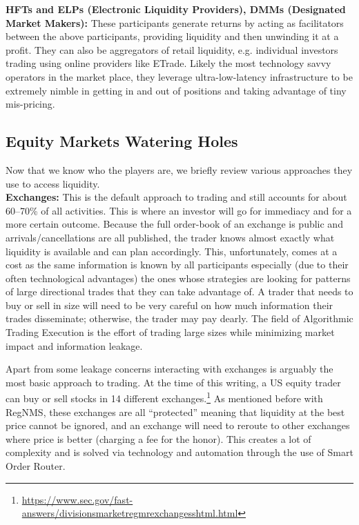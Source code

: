 \noindent\textbf{HFTs and ELPs (Electronic Liquidity Providers), DMMs (Designated Market Makers):} These participants generate returns by acting as facilitators between the above participants, providing liquidity and then unwinding it at a profit. They can also be aggregators of retail liquidity, e.g. individual investors trading using online providers like ETrade. Likely the most technology savvy operators in the market place, they leverage ultra-low-latency infrastructure to be extremely nimble in getting in and out of positions and taking advantage of tiny mis-pricing. 


\subsection{Equity Markets Watering Holes}


Now that we know who the players are, we briefly review various approaches they use to access liquidity. \\

\noindent\textbf{Exchanges:} This is the default approach to trading and still accounts for about 60--70\% of all activities. This is where an investor will go for immediacy and for a more certain outcome. Because the full order-book of an exchange is public and arrivals/cancellations are all published, the trader knows almost exactly what liquidity is available and can plan accordingly. This, unfortunately, comes at a cost as the same information is known by all participants especially (due to their often technological advantages) the ones whose strategies are looking for patterns of large directional trades that they can take advantage of. A trader that needs to buy or sell in size will need to be very careful on how much information their trades disseminate; otherwise, the trader may pay dearly. The field of Algorithmic Trading Execution is the effort of trading large sizes while minimizing market impact and information leakage. 


Apart from some leakage concerns interacting with exchanges is arguably the most basic approach to trading. At the time of this writing, a US equity trader can buy or sell stocks in 14 different exchanges.\footnote{\url{https://www.sec.gov/fast-answers/divisionsmarketregmrexchangesshtml.html}} As mentioned before with RegNMS, these exchanges are all ``protected'' meaning that liquidity at the best price cannot be ignored, and an exchange will need to reroute to other exchanges where price is better (charging a fee for the honor). This creates a lot of complexity and is solved via technology and automation through the use of Smart Order Router.


